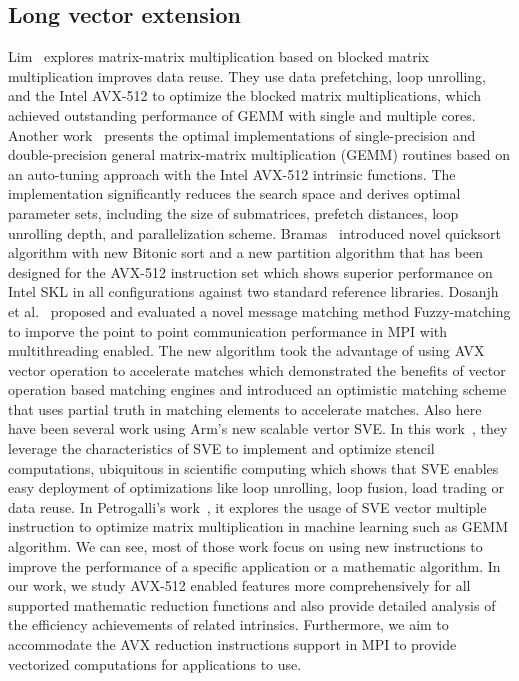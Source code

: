 \documentclass[sigconf]{acmart}
\newcommand{\sve}[0]{\textsc{SVE}\xspace}
\begin{document}
\subsection{Long vector extension}
Lim~\cite{Lim2018} explores matrix-matrix multiplication based on blocked matrix multiplication
improves data reuse. They use data prefetching, loop unrolling, and the Intel AVX-512
to optimize the blocked matrix multiplications, which achieved outstanding performance of GEMM
with single and multiple cores.
%
Another work~\cite{Kim19} presents the optimal implementations of single-precision and double-precision general matrix-matrix multiplication (GEMM) routines based on an auto-tuning approach with the Intel AVX-512 intrinsic functions.
The implementation significantly reduces the search space and derives optimal parameter sets, including the size of submatrices, prefetch distances, loop unrolling depth, and parallelization scheme.
%
Bramas~\cite{Bramas_2017} introduced novel quicksort algorithm with new Bitonic sort and a new
partition algorithm that has been designed for the AVX-512
instruction set which shows superior performance on Intel SKL in
all configurations against two standard reference libraries.
%
Dosanjh et al.~\cite{tag-match} proposed and evaluated a novel message matching method Fuzzy-matching
to imporve the point to point communication performance in MPI with multithreading enabled.
The new algorithm took the advantage of using AVX vector operation to accelerate matches
which demonstrated the benefits of vector operation based
matching engines and introduced an optimistic
matching scheme that uses partial truth in matching elements
to accelerate matches.
%
Also here have been several work using Arm's new scalable vertor SVE.
In this work~\cite{sve-stencil}, they leverage the characteristics of \sve to implement and optimize
stencil computations, ubiquitous in scientific computing which shows
that \sve enables easy deployment of optimizations like loop unrolling,
loop fusion, load trading or data reuse.
%
In Petrogalli's work~\cite{sve_ml}, it explores the usage of SVE vector multiple
instruction to optimize matrix multiplication in machine learning such as GEMM algorithm.
%
We can see, most of those work focus on using new instructions
to improve the performance of a specific application or a mathematic algorithm.
In our work, we study AVX-512 enabled features more comprehensively for
all supported mathematic reduction functions and also provide
detailed analysis of the efficiency achievements of related intrinsics.
Furthermore, we aim to accommodate the AVX reduction instructions support in MPI to provide
vectorized computations for applications to use.
\end{document}
